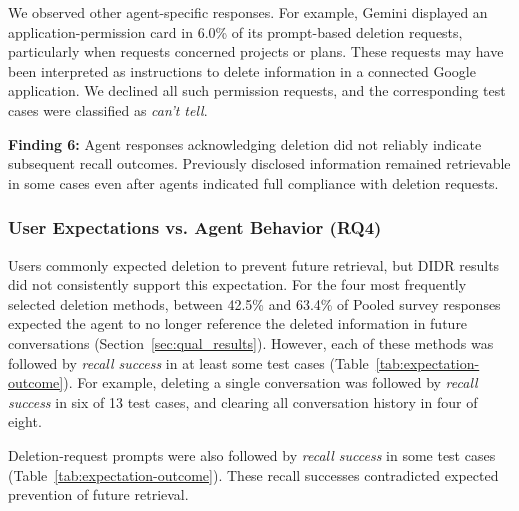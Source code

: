 %
We observed other agent-specific responses.
%
For example, Gemini displayed an application-permission card in 6.0\% of its prompt-based deletion requests, particularly when requests concerned projects or plans.
%
These requests may have been interpreted as instructions to delete information in a connected Google application.
%
We declined all such permission requests, and the corresponding test cases were classified as \textit{can't tell}.

\begin{takeawaybox}
\textbf{Finding 6:} Agent responses acknowledging deletion did not reliably indicate subsequent recall outcomes. Previously disclosed information remained retrievable in some cases even after agents indicated full compliance with deletion requests.
\end{takeawaybox}


\subsubsection{User Expectations vs. Agent Behavior (RQ4)}
\label{sec:expectation}

Users commonly expected deletion to prevent future retrieval, but DIDR results did not consistently support this expectation.
%
%
For the four most frequently selected deletion methods, between 42.5\% and 63.4\% of Pooled survey responses expected the agent to no longer reference the deleted information in future conversations (Section~\ref{sec:qual_results}).
%
However, each of these methods was followed by \textit{recall success} in at least some test cases (Table~\ref{tab:expectation-outcome}).
%
For example, deleting a single conversation was followed by \textit{recall success} in six of 13 test cases, and clearing all conversation history in four of eight.

%
Deletion-request prompts were also followed by \textit{recall success} in some test cases (Table~\ref{tab:expectation-outcome}).
%
These recall successes contradicted expected prevention of future retrieval.

